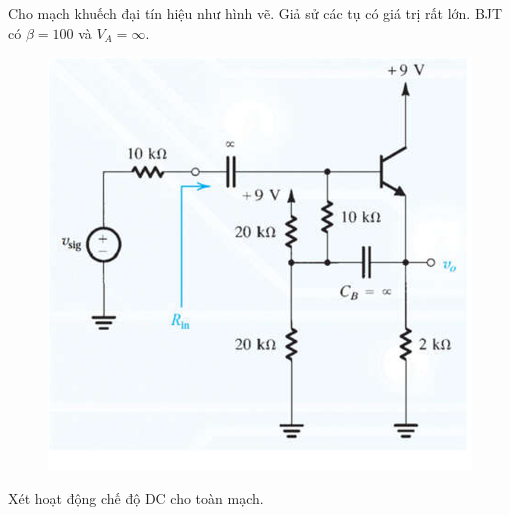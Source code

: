 
Cho mạch khuếch đại tín hiệu như hình vẽ. Giả sử các tụ có giá trị rất lớn. BJT có $\beta = 100$ và $V_{A} = \infty$.

\begin{figure}[H]
	\centering
	\includegraphics[width=.8\linewidth]{./my-chapters/my-images/Question4/Debai.png}
\end{figure}


\noindent Xét hoạt động chế độ DC cho toàn mạch.

